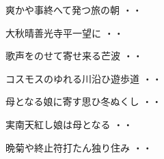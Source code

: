 \vspace{0.6cm}
\begin{shiika}爽かや事終へて発つ旅の朝
\hfill{・・}\end{shiika}
\vspace{0.6cm}
\begin{shiika}大秋晴善光寺平一望に
\hfill{・・}\end{shiika}
\vspace{0.6cm}
\begin{shiika}歌声をのせて寄せ来る芒波
\hfill{・・}\end{shiika}
\vspace{0.6cm}
\begin{shiika}コスモスのゆれる川沿ひ遊歩道
\hfill{・・}\end{shiika}
\vspace{0.6cm}
\begin{shiika}母となる娘に寄す思ひ冬ぬくし
\hfill{・・}\end{shiika}
\vspace{0.6cm}
\begin{shiika}実南天紅し娘は母となる
\hfill{・・}\end{shiika}
\vspace{0.6cm}
\begin{shiika}晩菊や終止符打たん独り住み
\hfill{・・}\end{shiika}
\vspace{0.6cm}
